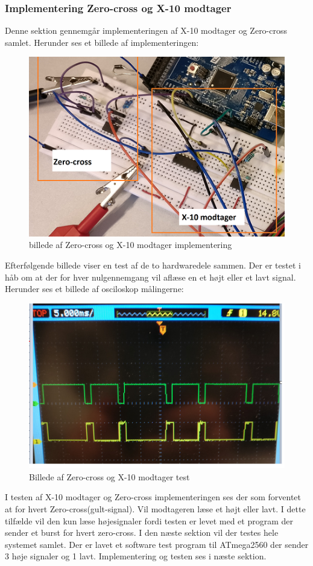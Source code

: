 \documentclass[11pt]{article}
\begin{document}
\subsubsection{Implementering Zero-cross og X-10 modtager}
Denne sektion gennemgår implementeringen af X-10 modtager og Zero-cross samlet. Herunder ses et billede af implementeringen:
\begin{figure}[H]
	\centering
	\includegraphics[scale = 0.8]{zeroXmodtagerimp}
	\caption{billede af Zero-cross og X-10 modtager implementering}
	\label{bil:ZeroXmodimp}
\end{figure}
Efterfølgende billede viser en test af de to hardwaredele sammen. Der er testet i håb om at der for hver nulgennemgang vil aflæse en et højt eller et lavt signal. Herunder ses et billede af osciloskop målingerne:
\begin{figure}[H]
	\centering
	\includegraphics[scale = 1]{zeromodtest}
	\caption{Billede af Zero-cross og X-10 modtager test}
	\label{bil:ZeroXmodtest}
\end{figure}
I testen af X-10 modtager og Zero-cross implementeringen ses der som forventet at for hvert Zero-cross(gult-signal). Vil modtageren læse et højt eller lavt. I dette tilfælde vil den kun læse højesignaler fordi testen er levet med et program der sender et burst for hvert zero-cross. I den næste sektion vil der testes hele systemet samlet. Der er lavet et software test program til ATmega2560 der sender 3 høje signaler og 1 lavt. Implementering og testen ses i næste sektion.
\end{document}
